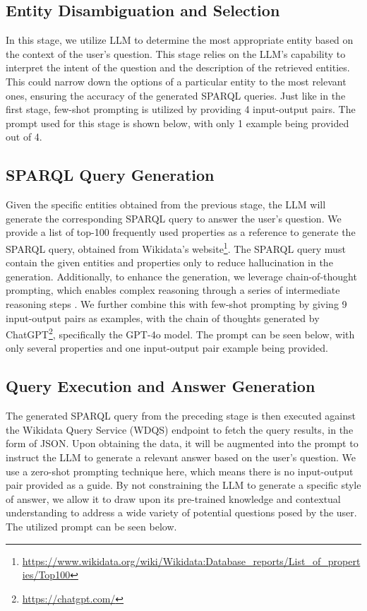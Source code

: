 \subsection{Entity Disambiguation and Selection}
\label{ent-sel}
In this stage, we utilize LLM to determine the most appropriate entity based on the context of the user's question. This stage relies on the LLM's capability to interpret the intent of the question and the description of the retrieved entities. This could narrow down the options of a particular entity to the most relevant ones, ensuring the accuracy of the generated SPARQL queries. Just like in the first stage, few-shot prompting is utilized by providing 4 input-output pairs. The prompt used for this stage is shown below, with only 1 example being provided out of 4.\\
\promptTwo

\subsection{SPARQL Query Generation}
\label{sparql-gener}
Given the specific entities obtained from the previous stage, the LLM will generate the corresponding SPARQL query to answer the user's question. We provide a list of top-100 frequently used properties as a reference to generate the SPARQL query, obtained from Wikidata's website\footnote{\url{https://www.wikidata.org/wiki/Wikidata:Database_reports/List_of_properties/Top100}}. The SPARQL query must contain the given entities and properties only to reduce hallucination in the generation. Additionally, to enhance the generation, we leverage chain-of-thought prompting, which enables complex reasoning through a series of intermediate reasoning steps \citep{wei2024cot}. We further combine this with few-shot prompting by giving 9 input-output pairs as examples, with the chain of thoughts generated by ChatGPT\footnote{\url{https://chatgpt.com/}}, specifically the GPT-4o model. The prompt can be seen below, with only several properties and one input-output pair example being provided.\\
\promptThree

\subsection{Query Execution and Answer Generation}
\label{answer-gen}
The generated SPARQL query from the preceding stage is then executed against the Wikidata Query Service (WDQS) endpoint to fetch the query results, in the form of JSON. Upon obtaining the data, it will be augmented into the prompt to instruct the LLM to generate a relevant answer based on the user's question. We use a zero-shot prompting technique here, which means there is no input-output pair provided as a guide. By not constraining the LLM to generate a specific style of answer, we allow it to draw upon its pre-trained knowledge and contextual understanding to address a wide variety of potential questions posed by the user. The utilized prompt can be seen below.\\
\promptFour

